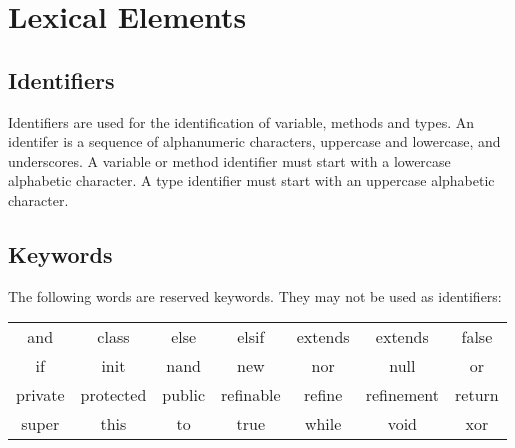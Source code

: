 \section{Lexical Elements}
\subsection{Identifiers}
Identifiers are used for the identification of variable,  methods and types. An identifer is a sequence of alphanumeric characters, uppercase and lowercase, and underscores. A variable or method identifier must start with a lowercase alphabetic character. A type identifier must start with an uppercase alphabetic character.

\subsection{Keywords}
The following words are reserved keywords. They may not be used as identifiers:
\begin{center}
\begin{tabular}{ccccccc}
and & class & else & elsif & extends & extends & false\\
if & init & nand & new & nor & null & or\\
private & protected & public & refinable & refine & refinement & return\\
super & this & to & true & while & void & xor\\
\end{tabular}
\end{center}